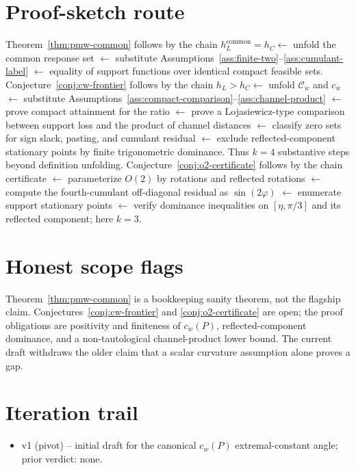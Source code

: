 \documentclass[11pt]{article}
\theoremstyle{definition}
\theoremstyle{plain}
\theoremstyle{remark}
\begin{document}
\section{Proof-sketch route}
Theorem~\ref{thm:pmw-common} follows by the chain \(h_L^{\mathrm{common}}=h_C \leftarrow\) unfold the common response set \(\leftarrow\) substitute Assumptions~\ref{ass:finite-two}--\ref{ass:cumulant-label} \(\leftarrow\) equality of support functions over identical compact feasible sets. Conjecture~\ref{conj:cw-frontier} follows by the chain \(h_L>h_C \leftarrow\) unfold \(\mathcal C_w\) and \(c_w\) \(\leftarrow\) substitute Assumptions~\ref{ass:compact-comparison}--\ref{ass:channel-product} \(\leftarrow\) prove compact attainment for the ratio \(\leftarrow\) prove a Lojasiewicz-type comparison between support loss and the product of channel distances \(\leftarrow\) classify zero sets for sign slack, pasting, and cumulant residual \(\leftarrow\) exclude reflected-component stationary points by finite trigonometric dominance. Thus \(k=4\) substantive steps beyond definition unfolding. Conjecture~\ref{conj:o2-certificate} follows by the chain certificate \(\leftarrow\) parameterize \(O(2)\) by rotations and reflected rotations \(\leftarrow\) compute the fourth-cumulant off-diagonal residual as \(\sin(2\varphi)\) \(\leftarrow\) enumerate support stationary points \(\leftarrow\) verify dominance inequalities on \([\eta,\pi/3]\) and its reflected component; here \(k=3\).

\section{Honest scope flags}
Theorem~\ref{thm:pmw-common} is a bookkeeping sanity theorem, not the flagship claim. Conjectures~\ref{conj:cw-frontier} and \ref{conj:o2-certificate} are open; the proof obligations are positivity and finiteness of \(c_w(P)\), reflected-component dominance, and a non-tautological channel-product lower bound. The current draft withdraws the older claim that a scalar curvature assumption alone proves a gap.

\section{Iteration trail}
\begin{itemize}[leftmargin=*]
\item v1 (pivot) -- initial draft for the canonical \(c_w(P)\) extremal-constant angle; prior verdict: none.
\end{itemize}
\end{document}
